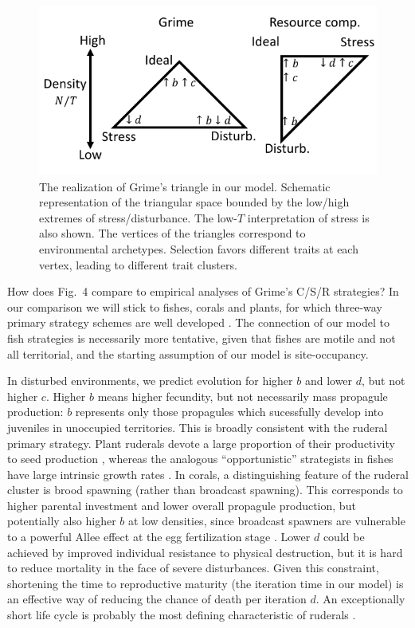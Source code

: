 \documentclass[11pt]{article}
\begin{document}
\begin{figure}
\centering
\includegraphics[scale=1]{axes.pdf}
\caption{\label{fig:axes} The realization of Grime's triangle in our model. Schematic representation of the triangular space bounded by the low/high extremes of stress/disturbance. The low-$T$ interpretation of stress is also shown. The vertices of the triangles correspond to environmental archetypes. Selection favors different traits at each vertex, leading to different trait clusters.} 
\end{figure}

How does Fig.~4 compare to empirical analyses of Grime's C/S/R strategies? In our comparison we will stick to fishes, corals and plants, for which three-way primary strategy schemes are well developed \citep{grime_1977,winemiller_1992,darling_2012}. The connection of our model to fish strategies is necessarily more tentative, given that fishes are motile and not all territorial, and the starting assumption of our model is site-occupancy. 

In disturbed environments, we predict evolution for higher $b$ and lower $d$, but not higher $c$. Higher $b$ means higher fecundity, but not necessarily mass propagule production: $b$ represents only those propagules which sucessfully develop into juveniles in unoccupied territories. This is broadly consistent with the ruderal primary strategy. Plant ruderals devote a large proportion of their productivity to seed production \cite{grime_1977}, whereas the analogous ``opportunistic'' strategists in fishes have large intrinsic growth rates \citep{winemiller_1992}. In corals, a distinguishing feature of the ruderal cluster is brood spawning (rather than broadcast spawning). This corresponds to higher parental investment and lower overall propagule production, but potentially also higher $b$ at low densities, since broadcast spawners are vulnerable to a powerful Allee effect at the egg fertilization stage \citep{knowlton_2001}. Lower $d$ could be achieved by improved individual resistance to physical destruction, but it is hard to reduce mortality in the face of severe disturbances. Given this constraint, shortening the time to reproductive maturity (the iteration time in our model) is an effective way of reducing the chance of death per iteration $d$. An exceptionally short life cycle is probably the most defining characteristic of ruderals \citep{grime_1977,winemiller_1992,darling_2012}.
\end{document}
